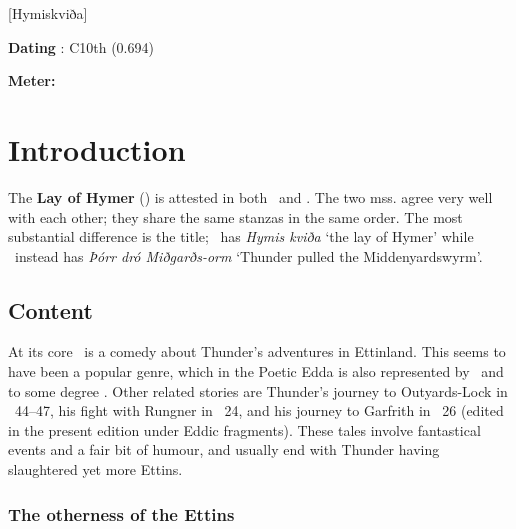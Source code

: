 [Hymiskviða]

\begin{flushright}%
\textbf{Dating} \parencite{Sapp2022}: C10th (0.694)

\textbf{Meter:} \Fornyrdislag%
\end{flushright}%

\section{Introduction}

{\small The \textbf{Lay of Hymer} (\Hymiskvida) is attested in both \Regius\ and \AM.  The two mss. agree very well with each other; they share the same stanzas in the same order.  The most substantial difference is the title; \AM\ has \emph{Hymis kviða} ‘the lay of Hymer’ while \Regius\ instead has \emph{Þórr dró Miðgarðs-orm} ‘Thunder pulled the Middenyardswyrm’.}

\subsection{Content}

{\small At its core \Hymiskvida\ is a comedy about Thunder’s adventures in Ettinland.  This seems to have been a popular genre, which in the Poetic Edda is also represented by \Thrymskvida\ and to some degree \Harbardsljod.  Other related stories are Thunder’s journey to Outyards-Lock in \Gylfaginning\ 44–47, his fight with Rungner in \Skaldskaparmal\ 24, and his journey to Garfrith in \Skaldskaparmal\ 26 (edited in the present edition under Eddic fragments).  These tales involve fantastical events and a fair bit of humour, and usually end with Thunder having slaughtered yet more Ettins.}

\subsubsection{The otherness of the Ettins}

